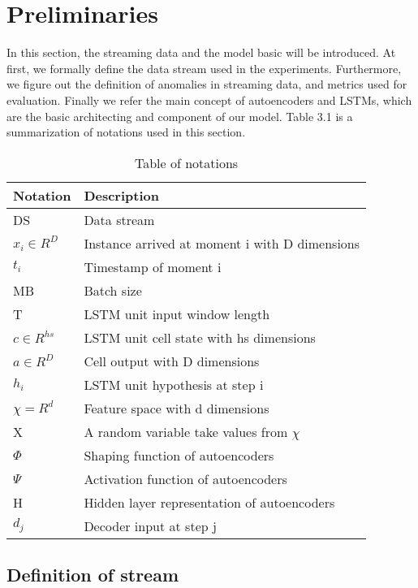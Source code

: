 \chapter{Preliminaries}
\label{chap:Preliminaries}

In this section, the streaming data and the model basic will be introduced. At first, we formally define the data stream used in the experiments. Furthermore, we figure out the definition of anomalies in streaming data, and metrics used for evaluation. Finally we refer the main concept of autoencoders and LSTMs, which are the basic architecting and component of our model. Table 3.1 is a summarization of notations used in this section.

\begin{table}[h]
\begin{center}
\begin{tabular}{|l|l|}
\hline
Notation & Description \\ \hline
DS & Data stream \\
$x_i \in R^D$ & Instance arrived at moment i with D dimensions\\
$t_i$ & Timestamp of moment i \\
MB & Batch size	\\	
T & LSTM unit input window length \\
$c \in R^{hs}$ & LSTM unit cell state with hs dimensions \\
$a \in R^{D}$ & Cell output with D dimensions \\ 
$h_i$ & LSTM unit hypothesis at step i \\
$\chi = R^d $ & Feature space with d dimensions  \\
X & A random variable take values from $\chi$	\\
$\Phi$ & Shaping function of autoencoders	\\	
$\Psi$ & Activation function of autoencoders	 \\
H & Hidden layer representation of autoencoders  \\
$d_j$ & Decoder input at step j\\ \hline

\end{tabular}
\end{center}
\label{tab:notation}
\caption{Table of notations}
\end{table}


\section{Definition of stream}
\label{sec:Definition of stream}

